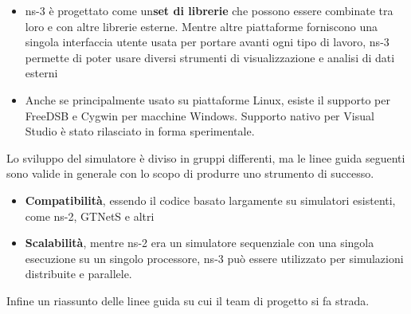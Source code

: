 \documentclass[12pt,a4paper,oneside]{book}
\begin{document}
		\begin{itemize}
			\item ns-3 è progettato come un{\bf set di librerie} che possono essere combinate tra loro e con altre librerie esterne. Mentre altre piattaforme forniscono una singola interfaccia utente usata per portare avanti ogni tipo di lavoro, ns-3 permette di poter usare diversi strumenti di visualizzazione e analisi di dati esterni
			
			\item Anche se principalmente usato su piattaforme Linux, esiste il supporto per FreeDSB e Cygwin per macchine Windows. Supporto nativo per Visual Studio è stato rilasciato in forma sperimentale. 
		\end{itemize}
		
		Lo sviluppo del simulatore è diviso in gruppi differenti, ma le linee guida seguenti sono valide in generale con lo scopo di produrre uno strumento di successo.
		\begin{itemize}
			\item {\bf Compatibilità}, essendo il codice basato largamente su simulatori esistenti, come ns-2, GTNetS e altri
			\item {\bf Scalabilità}, mentre ns-2 era un simulatore sequenziale con una singola esecuzione su un singolo processore, ns-3 può essere utilizzato per simulazioni distribuite e parallele. 
		\end{itemize}

		Infine un riassunto delle linee guida su cui il team di progetto si fa strada.
		
\end{document}
